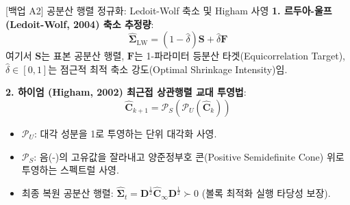 \begin{frame}{[백업 A2] 공분산 행렬 정규화: Ledoit-Wolf 축소 및 Higham 사영}
\textbf{1. 르두아-울프 (Ledoit-Wolf, 2004) 축소 추정량}:
\begin{equation*}
  \hat{\boldsymbol{\Sigma}}_{\text{LW}} = (1 - \hat{\delta}) \mathbf{S} + \hat{\delta} \mathbf{F}
\end{equation*}
여기서 $\mathbf{S}$는 표본 공분산 행렬, $\mathbf{F}$는 1-파라미터 등분산 타겟(Equicorrelation Target), $\hat{\delta} \in [0, 1]$는 점근적 최적 축소 강도(Optimal Shrinkage Intensity)임.

\vspace{3mm}
\textbf{2. 하이엄 (Higham, 2002) 최근접 상관행렬 교대 투영법}:
\begin{equation*}
  \hat{\mathbf{C}}_{k+1} = \mathcal{P}_S \left( \mathcal{P}_U (\hat{\mathbf{C}}_k) \right)
\end{equation*}
\begin{itemize}
  \small
  \item $\mathcal{P}_U$: 대각 성분을 1로 투영하는 단위 대각화 사영.
  \item $\mathcal{P}_S$: 음(-)의 고유값을 잘라내고 양준정부호 콘(Positive Semidefinite Cone) 위로 투영하는 스펙트럴 사영.
  \item 최종 복원 공분산 행렬: $\hat{\boldsymbol{\Sigma}}_t = \mathbf{D}^{\frac{1}{2}} \hat{\mathbf{C}}_\infty \mathbf{D}^{\frac{1}{2}} \succ 0$ (볼록 최적화 실행 타당성 보장).
\end{itemize}
\end{frame}

